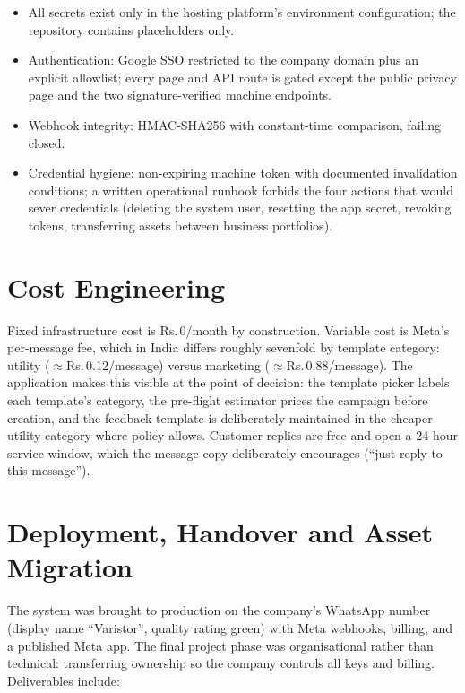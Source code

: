 \documentclass[11pt,a4paper]{article}
\newcommand{\rupee}{Rs.\,}
\begin{document}
\begin{itemize}[nosep]
  \item All secrets exist only in the hosting platform's environment
        configuration; the repository contains placeholders only.
  \item Authentication: Google SSO restricted to the company domain plus
        an explicit allowlist; every page and API route is gated except
        the public privacy page and the two signature-verified machine
        endpoints.
  \item Webhook integrity: HMAC-SHA256 with constant-time comparison,
        failing closed.
  \item Credential hygiene: non-expiring machine token with documented
        invalidation conditions; a written operational runbook forbids the
        four actions that would sever credentials (deleting the system
        user, resetting the app secret, revoking tokens, transferring
        assets between business portfolios).
\end{itemize}

\section{Cost Engineering}

Fixed infrastructure cost is \rupee 0/month by construction. Variable cost
is Meta's per-message fee, which in India differs roughly sevenfold by
template category: utility ($\approx$\rupee 0.12/message) versus marketing
($\approx$\rupee 0.88/message). The application makes this visible at the
point of decision: the template picker labels each template's category,
the pre-flight estimator prices the campaign before creation, and the
feedback template is deliberately maintained in the cheaper utility
category where policy allows. Customer replies are free and open a
24-hour service window, which the message copy deliberately encourages
(``just reply to this message'').

\section{Deployment, Handover and Asset Migration}

The system was brought to production on the company's WhatsApp number
(display name ``Varistor'', quality rating green) with Meta webhooks,
billing, and a published Meta app. The final project phase was
organisational rather than technical: transferring ownership so the
company controls all keys and billing. Deliverables include:
\end{document}

